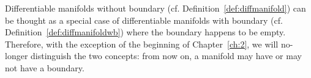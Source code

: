 \begin{tcolorbox}
	Differentiable manifolds without boundary (cf. Definition~\ref{def:diffmanifold}) can be thought as a special case of differentiable manifolds with boundary (cf. Definition~\ref{def:diffmanifoldwb}) where the boundary happens to be empty.
	Therefore, with the exception of the beginning of Chapter~\ref{ch:2}, we will no-longer distinguish the two concepts: from now on, a manifold may have or may not have a boundary.
\end{tcolorbox}
